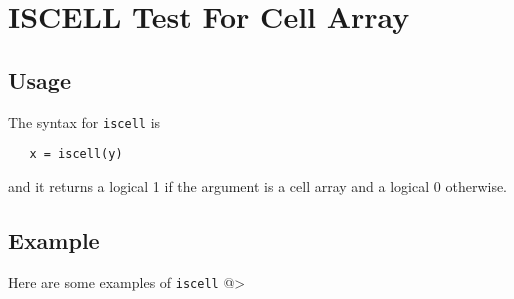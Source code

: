 \section{ISCELL Test For Cell Array}

\subsection{Usage}

The syntax for \verb|iscell| is 
\begin{verbatim}
   x = iscell(y)
\end{verbatim}
and it returns a logical 1 if the argument is a cell array
and a logical 0 otherwise.
\subsection{Example}

Here are some examples of \verb|iscell|
@>
